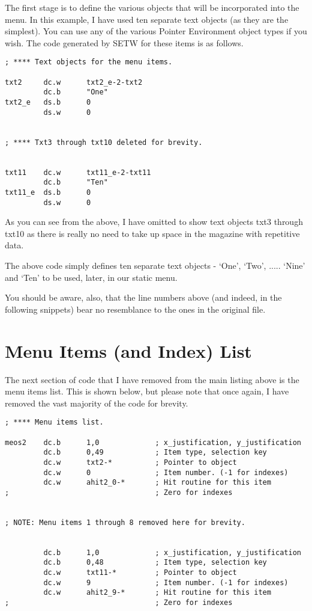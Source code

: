 The first stage is to define the various objects that will be
    incorporated into the menu. In this example, I have used ten separate text
    objects (as they are the simplest). You can use any of the various Pointer
    Environment object types if you wish. The code generated by
 SETW for these items is as follows.

\begin{lstlisting}[firstnumber=1,caption={AppMenuTest1Win\_asm - Menu Objects}]
; **** Text objects for the menu items.

txt2     dc.w      txt2_e-2-txt2
         dc.b      "One"
txt2_e   ds.b      0
         ds.w      0


; **** Txt3 through txt10 deleted for brevity.


txt11    dc.w      txt11_e-2-txt11
         dc.b      "Ten"
txt11_e  ds.b      0
         ds.w      0
\end{lstlisting}

As you can see from the above, I have omitted to show text objects
    txt3 through txt10 as there is really no need to take up space in the
    magazine with repetitive data.

The above code simply defines ten separate text objects -{} `One',
    `Two', ..... `Nine' and `Ten' to be used, later, in our static
    menu.

You should be aware, also, that the line numbers above (and indeed, in the following snippets) bear no resemblance to the ones in the original file.

\section{Menu Items (and Index) List}
\label{ch29-app-menu-item-list}%

The next section of code that I have removed from the main listing
    above is the menu items list. This is shown below, but please note that
    once again, I have removed the vast majority of the code for
    brevity.

\begin{lstlisting}[firstnumber=last,caption={AppMenuTest1Win\_asm - Menu Item List}]
; **** Menu items list. 

meos2    dc.b      1,0             ; x_justification, y_justification 
         dc.b      0,49            ; Item type, selection key
         dc.w      txt2-*          ; Pointer to object
         dc.w      0               ; Item number. (-1 for indexes)
         dc.w      ahit2_0-*       ; Hit routine for this item
;                                  ; Zero for indexes


; NOTE: Menu items 1 through 8 removed here for brevity.


         dc.b      1,0             ; x_justification, y_justification 
         dc.b      0,48            ; Item type, selection key
         dc.w      txt11-*         ; Pointer to object
         dc.w      9               ; Item number. (-1 for indexes)
         dc.w      ahit2_9-*       ; Hit routine for this item
;                                  ; Zero for indexes
\end{lstlisting}

